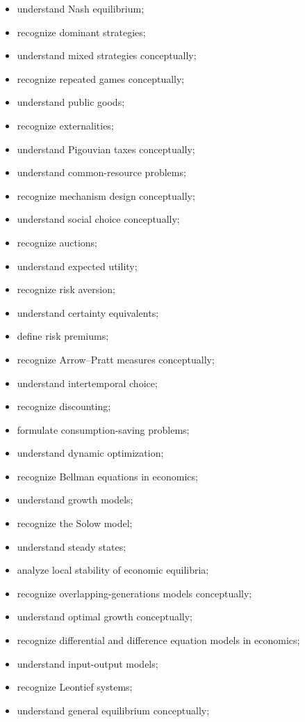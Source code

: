 {\begin{itemize}
    \item understand Nash equilibrium;
    \item recognize dominant strategies;
    \item understand mixed strategies conceptually;
    \item recognize repeated games conceptually;
    \item understand public goods;
    \item recognize externalities;
    \item understand Pigouvian taxes conceptually;
    \item understand common-resource problems;
    \item recognize mechanism design conceptually;
    \item understand social choice conceptually;
    \item recognize auctions;
    \item understand expected utility;
    \item recognize risk aversion;
    \item understand certainty equivalents;
    \item define risk premiums;
    \item recognize Arrow--Pratt measures conceptually;
    \item understand intertemporal choice;
    \item recognize discounting;
    \item formulate consumption-saving problems;
    \item understand dynamic optimization;
    \item recognize Bellman equations in economics;
    \item understand growth models;
    \item recognize the Solow model;
    \item understand steady states;
    \item analyze local stability of economic equilibria;
    \item recognize overlapping-generations models conceptually;
    \item understand optimal growth conceptually;
    \item recognize differential and difference equation models in economics;
    \item understand input-output models;
    \item recognize Leontief systems;
    \item understand general equilibrium conceptually;

\end{itemize}}
